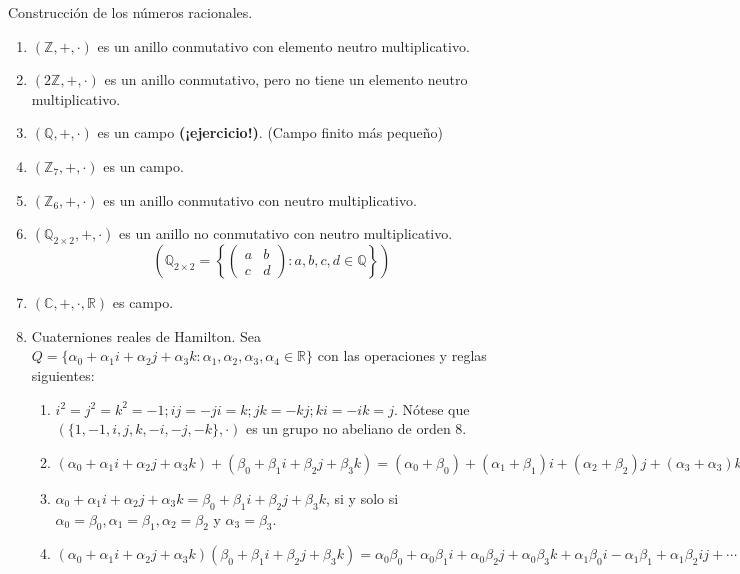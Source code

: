 \begin{cajita}
    Construcción de los números racionales.
\end{cajita}

\begin{ejemplo}
    \begin{enumerate}
        \item $(\mathbb{Z},+,\cdot)$ es un anillo conmutativo con elemento neutro multiplicativo.
        \item $(2\mathbb{Z},+,\cdot)$ es un anillo conmutativo, pero no tiene un elemento neutro multiplicativo.
        \item $(\mathbb{Q}, +,\cdot)$ es un campo \textbf{(¡ejercicio!)}. (Campo finito más pequeño)
        \item $(\mathbb{Z}_7,+,\cdot)$ es un campo.
        \item $(\mathbb{Z}_6,+,\cdot)$ es un anillo conmutativo con neutro multiplicativo. 
        \item $(\mathbb{Q}_{2\times 2},+,\cdot)$ es un anillo no conmutativo con neutro multiplicativo.  $$\left(\mathbb{Q}_{2\times 2}=\left\{\begin{pmatrix}
            a & b \\
            c & d
        \end{pmatrix}: a,b,c,d\in \mathbb{Q}\right\}\right)$$
        \item $(\mathbb{C},+,\cdot,\mathbb{R})$ es campo.
        \item Cuaterniones reales de Hamilton. Sea $Q=\{\alpha_0+\alpha_1i+\alpha_2j+\alpha_3k: \alpha_1,\alpha_2,\alpha_3,\alpha_4 \in \mathbb{R}\}$ con las operaciones y reglas siguientes: 
        \begin{enumerate}
            \item $i^2=j^2=k^2=-1; ij=-ji=k; jk=-kj; ki=-ik=j$. Nótese que $(\{1,-1,i,j,k,-i,-j,-k\},\cdot)$ es un grupo no abeliano de orden 8.
            \item $(\alpha_0+\alpha_1 i+\alpha_2j+\alpha_3k)+(\beta_0+\beta_1i+\beta_2j+\beta_3k)=(\alpha_0+\beta_0)+(\alpha_1+\beta_1)i+(\alpha_2+\beta_2)j+(\alpha_3+\alpha_3)k$
            \item $\alpha_0+\alpha_1i+\alpha_2j +\alpha_3 k =\beta_0 +\beta_1i+\beta_2j+\beta_3k$, si y solo si $\alpha_0=\beta_0, \alpha_1=\beta_1,\alpha_2=\beta_2$ y $\alpha_3=\beta_3$. 
            \item $(\alpha_0 +\alpha_1i+\alpha_2j+\alpha_3k)(\beta_0 +\beta_1i+\beta_2j+\beta_3k)=\alpha_0\beta_0 +\alpha_0\beta_1i+\alpha_0\beta_2j +\alpha_0\beta_3k+\alpha_1\beta_0 i -\alpha_1\beta_1+\alpha_1\beta_2 ij+\cdots = (a_0\beta_0+\alpha_1\beta_1-\alpha_2\beta_2-\alpha_2\beta_2)+(\alpha_0\beta_1+\alpha_1\beta_0+\alpha_2\beta_3-\alpha_3\beta_2)i+(\alpha_0\beta_2-\alpha_1\beta_3+\alpha_2\beta_0+\alpha_3\beta_1)j +(\alpha_0\beta_3+\alpha_1\beta_2 -\alpha_2\beta_1 +\alpha_3\beta_0)k$

\end{enumerate}
\end{enumerate}
\end{ejemplo}
